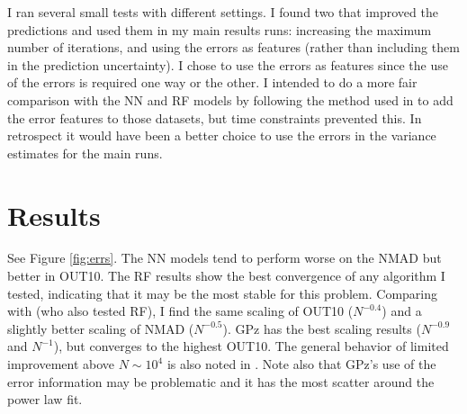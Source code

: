 \documentclass[13pt]{amsart}
\begin{document}
      I ran several small tests with different settings. I found two that improved the predictions and used them in my main results runs: increasing the maximum number of iterations, and using the errors as features (rather than including them in the prediction uncertainty). I chose to use the errors as features since the use of the errors is required one way or the other. I intended to do a more fair comparison with the NN and RF models by following the method used in \cite{graham} to add the error features to those datasets, but time constraints prevented this. In retrospect it would have been a better choice to use the errors in the variance estimates for the main runs.


\section{Results}
\label{sec:results}

  See Figure \ref{fig:errs}. The NN models tend to perform worse on the NMAD but better in OUT10. The RF results show the best convergence of any algorithm I tested, indicating that it may be the most stable for this problem. Comparing with \cite{newman} (who also tested RF), I find the same scaling of OUT10 ($N^{-0.4}$) and a slightly better scaling of NMAD ($N^{-0.5}$). GPz has the best scaling results ($N^{-0.9}$ and $N^{-1}$), but converges to the highest OUT10. The general behavior of limited improvement above $N\sim10^4$ is also noted in \cite{gpz}. Note also that GPz's use of the error information may be problematic and it has the most scatter around the power law fit.
\end{document}
